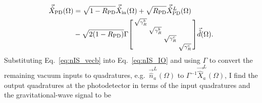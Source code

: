 \begin{align}
\label{eq:nIS_IO}
\vec{\hat X}_\mathrm{PD}(\Omega)&=\sqrt{1-R_\text{PD}}\vec{\hat X}_\mathrm{in}(\Omega)+\sqrt{R_\text{PD}}\vec{\hat X}^L_\text{PD}(\Omega)\nonumber\\
&-\sqrt{2(1-R_\text{PD})}\Gamma\begin{bsmallmatrix}
\sqrt{\gamma^b_R} &  &  &  \\
 & \sqrt{\gamma^b_R} &  &  \\
 &  & \sqrt{\gamma^c_R} &  \\
 &  &  & \sqrt{\gamma^c_R}
\end{bsmallmatrix}\vec{\hat d}(\Omega).
\end{align}
Substituting Eq.~\ref{eq:nIS_vecb} into Eq.~\ref{eq:nIS_IO} and using $\Gamma$ to convert the remaining vacuum inputs to quadratures, e.g.\ $\vec{\hat{n}}^L_a(\Omega)$ to $\Gamma^{-1}\vec{\hat X}^L_a(\Omega)$, I find the output quadratures at the photodetector in terms of the input quadratures and the gravitational-wave signal to be
\begingroup
\allowdisplaybreaks
